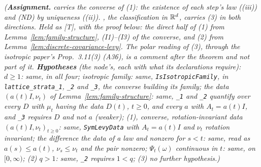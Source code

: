 \begin{theorem}
\statusA\quad{}\quad{}\quad\emph{(\textbf{Assignment.}  carries the
converse of (1): the existence of each step's law ((iii)) and (ND) by uniqueness ((ii)).
, the classification in $\mathbb{R}^d$, carries (3) in both directions. Held as [T], with the
proof below: the direct half of (1) from Lemma~\ref{lem:family-structure}, (I1)--(I3) of the
converse, and (2) from Lemma~\ref{lem:discrete-covariance-levy}. The polar reading of (3), through
the isotropic paper's Prop.~3.11(3) (A36), is a comment after the theorem and not part of it.
\textbf{Hypotheses} (the node's, each with what its declarations require): $d \ge 1$: same, in all
four; isotropic family: same, \texttt{IsIsotropicFamily}, in \texttt{lattice\_strata\_1},
\texttt{\_2} and \texttt{\_3}, the converse building its family; the data $(a(t)I, \nu_t)$ of
Lemma~\ref{lem:family-structure}: same, \texttt{\_1} and \texttt{\_2} quantify over every $D$
with $\mu_t$ having the data $D(t)$, $t \ge 0$, and every $a$ with $A_t = a(t)I$, and
\texttt{\_3} requires $D$ and not $a$ (weaker); (1), converse, rotation-invariant \Levy{} data
$(a(t)I, \nu_t)_{t \ge 0}$: same, \texttt{SymLevyData} with $A_t = a(t)I$ and $\nu_t$ rotation
invariant; the difference the data of a law and nonzero for $s < t$: same, read as
$a(s) \le a(t)$, $\nu_s \le \nu_t$ and the pair nonzero; $\Psi_t(\omega)$ continuous in $t$: same,
on $[0,\infty)$; (2) $q > 1$: same, \texttt{\_2} requires $1 < q$; (3) no further hypothesis.)}
\end{theorem}

